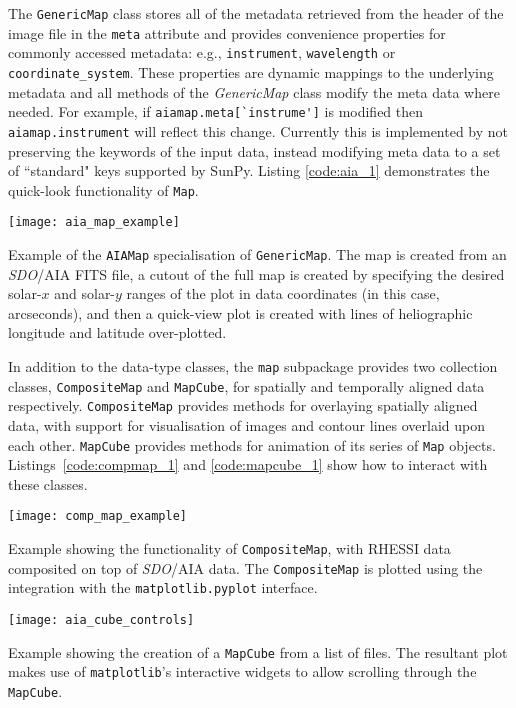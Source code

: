 The \texttt{GenericMap} class stores all of the metadata retrieved from the header of
the image file in the \texttt{meta} attribute and provides convenience 
properties for commonly accessed metadata: e.g., \texttt{instrument}, 
\texttt{wavelength} or \texttt{coordinate\_system}.
These properties are dynamic mappings to the underlying metadata and all methods 
of the \textit{GenericMap} class modify the meta data where needed.
For example, if \verb|aiamap.meta[`instrume']| is modified then \verb|aiamap.instrument| 
will reflect this change.
Currently this is implemented by not preserving the keywords of the input data,
instead modifying meta data to a set of ``standard" keys supported by SunPy.
Listing \ref{code:aia_1} demonstrates the quick-look functionality of 
\texttt{Map}.

\begin{listing}[H]
\begin{center}
\texttt{[image: aia\_map\_example]}
\end{center}
\caption{Example of the \texttt{AIAMap} specialisation of 
\texttt{GenericMap}. The map is created from an \textit{SDO}/AIA FITS file, a cutout
of the full map is created by specifying the desired solar-$x$ and solar-$y$ ranges of the plot in data coordinates (in this case, arcseconds), and then a quick-view plot is created with lines of heliographic longitude and latitude over-plotted.}
\label{code:aia_1}
\end{listing}

In addition to the data-type classes, the \texttt{map} subpackage provides two 
collection classes, \texttt{CompositeMap} and \texttt{MapCube}, for 
spatially and temporally aligned data respectively.
\texttt{CompositeMap} provides methods for overlaying spatially aligned 
data, with support for visualisation of images and contour lines overlaid 
upon each other.
\texttt{MapCube} provides methods for animation of its series of \texttt{Map} 
objects. Listings~\ref{code:compmap_1} and \ref{code:mapcube_1} show how to 
interact with these classes.

\begin{listing}[H]
\begin{center}
\texttt{[image: comp\_map\_example]}
\end{center}
\caption{Example showing the functionality of \texttt{CompositeMap}, with RHESSI data composited
on top of \textit{SDO}/AIA data. The \texttt{CompositeMap} is plotted using the integration with the \texttt{matplotlib.pyplot} interface.}
\label{code:compmap_1}
\end{listing}

\begin{listing}[H]
\begin{center}
\texttt{[image: aia\_cube\_controls]}
\end{center}
\caption{Example showing the creation of a \texttt{MapCube} from a list of files. The 
resultant plot makes use of \texttt{matplotlib}'s interactive widgets to allow scrolling 
through the \texttt{MapCube}.}
\label{code:mapcube_1}
\end{listing}

